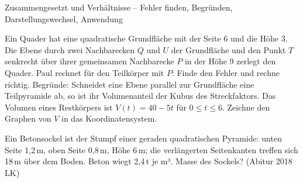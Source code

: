\begin{aufgabe}{Zusammengesetzt und Verhältnisse – Fehler finden, Begründen, Darstellungswechsel, Anwendung}
\begin{teile}
\teil Ein Quader hat eine quadratische Grundfläche mit der Seite 6 und die Höhe 3. Die Ebene durch zwei Nachbarecken $Q$ und $U$ der Grundfläche und den Punkt $T$ senkrecht über ihrer gemeinsamen Nachbarecke $P$ in der Höhe 9 zerlegt den Quader. Paul rechnet für den Teilkörper mit $P$:  Finde den Fehler und rechne richtig.
\teil Begründe: Schneidet eine Ebene parallel zur Grundfläche eine Teilpyramide ab, so ist ihr Volumenanteil der Kubus des Streckfaktors.
\teil Das Volumen eines Restkörpers ist $V(t) = 40 - 5t$ für $0 \le t \le 6$. Zeichne den Graphen von $V$ in das Koordinatensystem.

\begin{ksys}[xmin=0,xmax=7,ymin=0,ymax=45,xstep=1,ystep=5,xlabel=t,ylabel=V] \end{ksys}
\teil Ein Betonsockel ist der Stumpf einer geraden quadratischen Pyramide: unten Seite 1{,}2\,m, oben Seite 0{,}8\,m, Höhe 6\,m; die verlängerten Seitenkanten treffen sich 18\,m über dem Boden. Beton wiegt 2{,}4\,t je m³. Masse des Sockels? \hfill (Abitur 2018 LK) \\ \leerfeld[t]
\end{teile}
\end{aufgabe}
